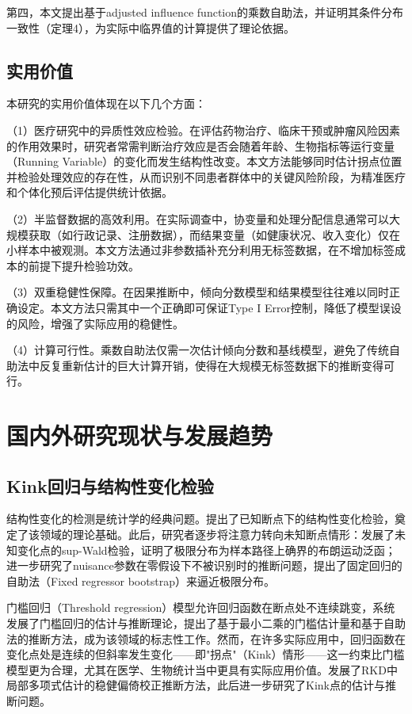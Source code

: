 \documentclass[12pt,a4paper]{ctexart}
\renewcommand*{\cite}{\supercite}
\begin{document}
第四，本文提出基于adjusted influence function的乘数自助法，并证明其条件分布一致性（定理4），为实际中临界值的计算提供了理论依据。

\subsection{实用价值}

本研究的实用价值体现在以下几个方面：

（1）医疗研究中的异质性效应检验。在评估药物治疗、临床干预或肿瘤风险因素的作用效果时，研究者常需判断治疗效应是否会随着年龄、生物指标等运行变量（Running Variable）的变化而发生结构性改变。本文方法能够同时估计拐点位置并检验处理效应的存在性，从而识别不同患者群体中的关键风险阶段，为精准医疗和个体化预后评估提供统计依据。

（2）半监督数据的高效利用。在实际调查中，协变量和处理分配信息通常可以大规模获取（如行政记录、注册数据），而结果变量（如健康状况、收入变化）仅在小样本中被观测。本文方法通过非参数插补充分利用无标签数据，在不增加标签成本的前提下提升检验功效。

（3）双重稳健性保障。在因果推断中，倾向分数模型和结果模型往往难以同时正确设定。本文方法只需其中一个正确即可保证Type I Error控制，降低了模型误设的风险，增强了实际应用的稳健性。

（4）计算可行性。乘数自助法仅需一次估计倾向分数和基线模型，避免了传统自助法中反复重新估计的巨大计算开销，使得在大规模无标签数据下的推断变得可行。

\section{国内外研究现状与发展趋势}

\subsection{Kink回归与结构性变化检验}

结构性变化的检测是统计学的经典问题。\cite{chow1960}提出了已知断点下的结构性变化检验，奠定了该领域的理论基础。此后，研究者逐步将注意力转向未知断点情形：\cite{andrews1993}发展了未知变化点的sup-Wald检验，证明了极限分布为样本路径上确界的布朗运动泛函；\cite{hansen1996}进一步研究了nuisance参数在零假设下不被识别时的推断问题，提出了固定回归的自助法（Fixed regressor bootstrap）来逼近极限分布。

门槛回归（Threshold regression）模型允许回归函数在断点处不连续跳变，\cite{hansen2000}系统发展了门槛回归的估计与推断理论，提出了基于最小二乘的门槛估计量和基于自助法的推断方法，成为该领域的标志性工作。然而，在许多实际应用中，回归函数在变化点处是连续的但斜率发生变化——即"拐点"（Kink）情形——这一约束比门槛模型更为合理，尤其在医学、生物统计当中更具有实际应用价值。\cite{calonico2014}发展了RKD中局部多项式估计的稳健偏倚校正推断方法，此后\cite{card2017}进一步研究了Kink点的估计与推断问题。
\end{document}
